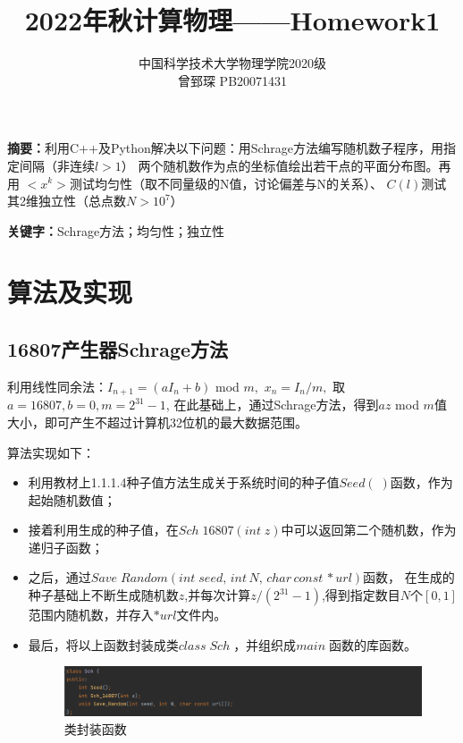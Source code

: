 \documentclass{article}
\title{2022年秋计算物理——Homework1}
\author{中国科学技术大学物理学院2020级\\曾郅琛      PB20071431}
\begin{document}
    \maketitle
    \setlength{\parindent}{2em}
    \maketitle
	\textbf{摘要：}利用C++及Python解决以下问题：用Schrage方法编写随机数子程序，用指定间隔（非连续$l >1$）
    两个随机数作为点的坐标值绘出若干点的平面分布图。再用
    $<x^k>$测试均匀性（取不同量级的N值，讨论偏差与N的关系）、
    $C(l) $测试其2维独立性（总点数$N > 10^7$）	
	
    \textbf{关键字：}Schrage方法；均匀性；独立性

    \section{算法及实现}
        \subsection{16807产生器Schrage方法}
            利用线性同余法：$I_{n+1}=(aI_n+b)$ mod $m,$  $x_n=I_n/m,$ 取$a=16807,b=0,m=2^{31}-1$,
            在此基础上，通过Schrage方法，得到$az$ mod $m$值大小，即可产生不超过计算机32位机的最大数据范围。

            算法实现如下：
\bigotimes 
            \begin{itemize}
                \item 利用教材上1.1.1.4种子值方法生成关于系统时间的种子值$Seed(\;)$函数，作为起始随机数值；
                \item 接着利用生成的种子值，在$Sch \;16807(int \;z)$中可以返回第二个随机数，作为递归子函数；
                \item 之后，通过$Save\;Random(int\;seed,\,int \, N,\,char \,const \,*url)$函数，
                        在生成的种子基础上不断生成随机数$z$,并每次计算$z/(2^{31}-1)$,得到指定数目$N$个$[0,1]$范围内随机数，并存入$*url$文件内。
                \item 最后，将以上函数封装成类$class\; Sch {\;}$，并组织成$main{\;}$函数的库函数。
                \begin{figure}[H]
                    \centering
                    \includegraphics[width= .8\textwidth]{picture/111.png}
                    \caption{类封装函数}
                \end{figure}
            \end{itemize}
\end{document}
